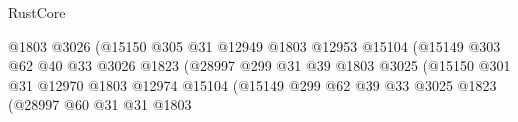 \begin{lexlean}{RustCore}
\begin{coremodule}
                                                    @1803
                                                    @3026
                                                    (@15150
                                                      @305
                                                      @31
                                                      @12949
                                                      @1803
                                                      @12953
                                                      @15104
                                                      (@15149
                                                        @303
                                                        @62
                                                        @40
                                                        @33
                                                        @3026
                                                        @1823
                                                        (@28997
                                                          @299
                                                          @31
                                                          @39
                                                          @1803
                                                          @3025
                                                          (@15150
                                                            @301
                                                            @31
                                                            @12970
                                                            @1803
                                                            @12974
                                                            @15104
                                                            (@15149
                                                              @299
                                                              @62
                                                              @39
                                                              @33
                                                              @3025
                                                              @1823
                                                              (@28997
                                                                @60
                                                                @31
                                                                @31
                                                                @1803

\end{coremodule}
\end{lexlean}
